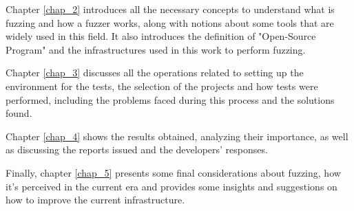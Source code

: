 Chapter \ref{chap_2} introduces all the necessary concepts to understand what is fuzzing and how a fuzzer works, along with notions about some tools that are widely used in this field. It also introduces the definition of "Open-Source Program" and the infrastructures used in this work to perform fuzzing.

Chapter \ref{chap_3} discusses all the operations related to setting up the environment for the tests, the selection of the projects and how tests were performed, including the problems faced during this process and the solutions found.

Chapter \ref{chap_4} shows the results obtained, analyzing their importance, as well as discussing the reports issued and the developers' responses.

Finally, chapter \ref{chap_5} presents some final considerations about fuzzing, how it's perceived in the current era and provides some insights and suggestions on how to improve the current infrastructure.
